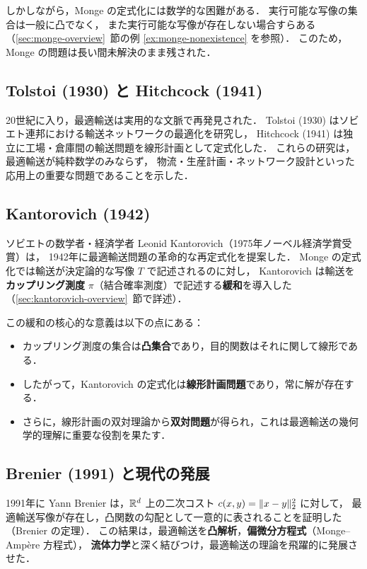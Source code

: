 しかしながら，Monge の定式化には数学的な困難がある．
実行可能な写像の集合は一般に凸でなく，
また実行可能な写像が存在しない場合すらある（\ref{sec:monge-overview}~節の例 \ref{ex:monge-nonexistence} を参照）．
このため，Monge の問題は長い間未解決のまま残された．

\subsection*{Tolstoi (1930) と Hitchcock (1941)}

20世紀に入り，最適輸送は実用的な文脈で再発見された．
Tolstoi (1930) はソビエト連邦における輸送ネットワークの最適化を研究し，
Hitchcock (1941) は独立に工場・倉庫間の輸送問題を線形計画として定式化した．
これらの研究は，最適輸送が純粋数学のみならず，
物流・生産計画・ネットワーク設計といった応用上の重要な問題であることを示した．

\subsection*{Kantorovich (1942)}

ソビエトの数学者・経済学者 Leonid Kantorovich（1975年ノーベル経済学賞受賞）は，
1942年に最適輸送問題の革命的な再定式化を提案した．
Monge の定式化では輸送が決定論的な写像 $T$ で記述されるのに対し，
Kantorovich は輸送を\textbf{カップリング測度} $\pi$（結合確率測度）で記述する\textbf{緩和}を導入した
（\ref{sec:kantorovich-overview}~節で詳述）．

この緩和の核心的な意義は以下の点にある：
\begin{itemize}
  \item カップリング測度の集合は\textbf{凸集合}であり，目的関数はそれに関して線形である．
  \item したがって，Kantorovich の定式化は\textbf{線形計画問題}であり，常に解が存在する．
  \item さらに，線形計画の双対理論から\textbf{双対問題}が得られ，これは最適輸送の幾何学的理解に重要な役割を果たす．
\end{itemize}

\subsection*{Brenier (1991) と現代の発展}

1991年に Yann Brenier は，$\mathbb{R}^d$ 上の二次コスト $c(x,y) = \lVert x-y \rVert_2^2$ に対して，
最適輸送写像が存在し，凸関数の勾配として一意的に表されることを証明した（Brenier の定理）．
この結果は，最適輸送を\textbf{凸解析}，\textbf{偏微分方程式}（Monge--Amp\`{e}re 方程式），
\textbf{流体力学}と深く結びつけ，最適輸送の理論を飛躍的に発展させた．

